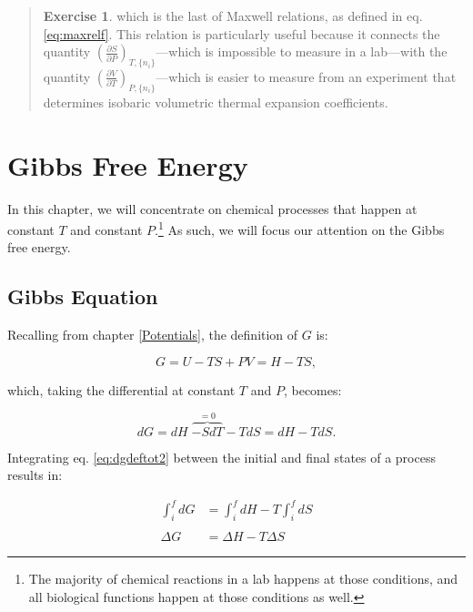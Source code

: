 \documentclass[
  9pt,
]{extbook}
\theoremstyle{definition}
\theoremstyle{definition}
\theoremstyle{definition}
\newtheorem{exercise}{Exercise}[chapter]
\theoremstyle{remark}
\begin{document}
\begin{quote}
\begin{exercise}
which is the last of Maxwell relations, as defined in eq. \eqref{eq:maxrelf}. This relation is particularly useful because it connects the quantity \(\left(\frac{\partial S}{\partial P} \right)_{T,\{n_i\}}\)---which is impossible to measure in a lab---with the quantity \(\left(\frac{\partial V}{\partial T} \right)_{P,\{n_i\}}\)---which is easier to measure from an experiment that determines isobaric volumetric thermal expansion coefficients.
\end{exercise}
\end{quote}

\renewcommand*{\standardstate}{{-\kern-6pt{\ominus}\kern-6pt-}}

\hypertarget{GibbsFree}{%
\chapter{Gibbs Free Energy}\label{GibbsFree}}

In this chapter, we will concentrate on chemical processes that happen at constant \(T\) and constant \(P\).\footnote{The majority of chemical reactions in a lab happens at those conditions, and all biological functions happen at those conditions as well.} As such, we will focus our attention on the Gibbs free energy.

\hypertarget{gibbseqsec}{%
\section{Gibbs Equation}\label{gibbseqsec}}

Recalling from chapter \ref{Potentials}, the definition of \(G\) is:

\begin{equation}
G = U -TS +PV = H-TS,
\label{eq:dgdeftot}
\end{equation}

which, taking the differential at constant \(T\) and \(P\), becomes:

\begin{equation}
dG = dH \; \overbrace{-SdT}^{=0} -TdS = dH -TdS.
\label{eq:dgdeftot2}
\end{equation}

Integrating eq. \eqref{eq:dgdeftot2} between the initial and final states of a process results in:

\begin{equation}
\begin{aligned}
\int_i^f dG &= \int_i^f dH -T \int_i^f dS \\
\\
\Delta G &= \Delta H -T \Delta S
\end{aligned}
\label{eq:gibbseq}
\end{equation}
\end{document}
